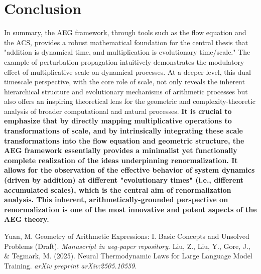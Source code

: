 \documentclass{article}
\begin{document}
\section{Conclusion}
In summary, the AEG framework, through tools such as the flow equation and the ACS, provides a robust mathematical foundation for the central thesis that "addition is dynamical time, and multiplication is evolutionary time/scale." The example of perturbation propagation intuitively demonstrates the modulatory effect of multiplicative scale on dynamical processes. At a deeper level, this dual timescale perspective, with the core role of scale, not only reveals the inherent hierarchical structure and evolutionary mechanisms of arithmetic processes but also offers an inspiring theoretical lens for the geometric and complexity-theoretic analysis of broader computational and natural processes. \textbf{It is crucial to emphasize that by directly mapping multiplicative operations to transformations of scale, and by intrinsically integrating these scale transformations into the flow equation and geometric structure, the AEG framework essentially provides a minimalist yet functionally complete realization of the ideas underpinning renormalization. It allows for the observation of the effective behavior of system dynamics (driven by addition) at different "evolutionary times" (i.e., different accumulated scales), which is the central aim of renormalization analysis. This inherent, arithmetically-grounded perspective on renormalization is one of the most innovative and potent aspects of the AEG theory.}

\begin{thebibliography}{9}
     Yuan, M. Geometry of Arithmetic Expressions: I. Basic Concepts and Unsolved Problems (Draft). \textit{Manuscript in aeg-paper repository}.
     Liu, Z., Liu, Y., Gore, J., \& Tegmark, M. (2025). Neural Thermodynamic Laws for Large Language Model Training. \textit{arXiv preprint arXiv:2505.10559}.
\end{thebibliography}
\end{document}
